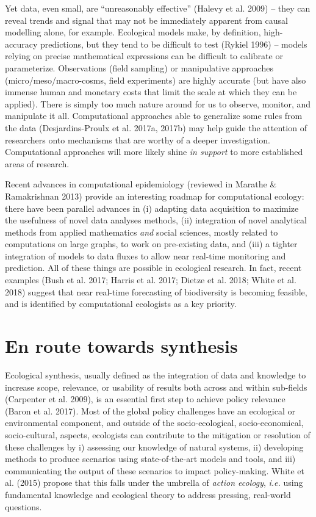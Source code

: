 \documentclass[12pt]{article}
\begin{document}
Yet data, even small, are \enquote{unreasonably effective} (Halevy et
al. 2009) -- they can reveal trends and signal that may not be
immediately apparent from causal modelling alone, for example.
Ecological models make, by definition, high-accuracy predictions, but
they tend to be difficult to test (Rykiel 1996) -- models relying on
precise mathematical expressions can be difficult to calibrate or
parameterize. Observations (field sampling) or manipulative approaches
(micro/meso/macro-cosms, field experiments) are highly accurate (but
have also immense human and monetary costs that limit the scale at which
they can be applied). There is simply too much nature around for us to
observe, monitor, and manipulate it all. Computational approaches able
to generalize some rules from the data (Desjardins-Proulx et al. 2017a,
2017b) may help guide the attention of researchers onto mechanisms that
are worthy of a deeper investigation. Computational approaches will more
likely shine \emph{in support} to more established areas of research.

Recent advances in computational epidemiology (reviewed in Marathe \&
Ramakrishnan 2013) provide an interesting roadmap for computational
ecology: there have been parallel advances in (i) adapting data
acquisition to maximize the usefulness of novel data analyses methods,
(ii) integration of novel analytical methods from applied mathematics
\emph{and} social sciences, mostly related to computations on large
graphs, to work on pre-existing data, and (iii) a tighter integration of
models to data fluxes to allow near real-time monitoring and prediction.
All of these things are possible in ecological research. In fact, recent
examples (Bush et al. 2017; Harris et al. 2017; Dietze et al. 2018;
White et al. 2018) suggest that near real-time forecasting of
biodiversity is becoming feasible, and is identified by computational
ecologists as a key priority.

\hypertarget{en-route-towards-synthesis}{%
\section{En route towards synthesis}\label{en-route-towards-synthesis}}

Ecological synthesis, usually defined as the integration of data and
knowledge to increase scope, relevance, or usability of results both
across and within sub-fields (Carpenter et al. 2009), is an essential
first step to achieve policy relevance (Baron et al. 2017). Most of the
global policy challenges have an ecological or environmental component,
and outside of the socio-ecological, socio-economical, socio-cultural,
aspects, ecologists can contribute to the mitigation or resolution of
these challenges by i) assessing our knowledge of natural systems, ii)
developing methods to produce scenarios using state-of-the-art models
and tools, and iii) communicating the output of these scenarios to
impact policy-making. White et al. (2015) propose that this falls under
the umbrella of \emph{action ecology}, \emph{i.e.} using fundamental
knowledge and ecological theory to address pressing, real-world
questions.
\end{document}
